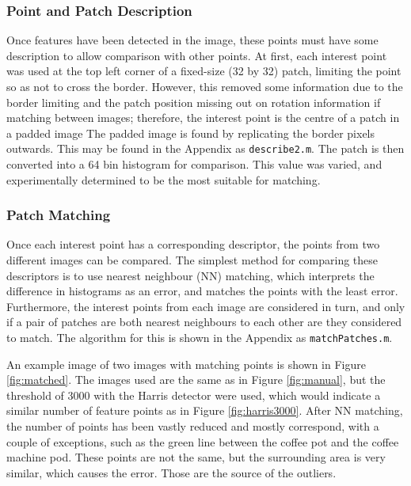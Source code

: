 \documentclass[a4paper, 10pt, conference]{ieeeconf}
\begin{document}
\subsubsection{Point and Patch Description}
Once features have been detected in the image, these points must have some description to allow comparison with other points. At first, each interest point was used at the top left corner of a fixed-size (32 by 32) patch, limiting the point so as not to cross the border. However, this removed some information due to the border limiting and the patch position missing out on rotation information if matching between images; therefore, the interest point is the centre of a patch in a padded image The padded image is found by replicating the border pixels outwards. This may be found in the Appendix as \texttt{describe2.m}. The patch is then converted into a 64 bin histogram for comparison. This value was varied, and experimentally determined to be the most suitable for matching.

\subsubsection{Patch Matching}
Once each interest point has a corresponding descriptor, the points from two different images can be compared. The simplest method for comparing these descriptors is to use nearest neighbour (NN) matching, which interprets the difference in histograms as an error, and matches the points with the least error. Furthermore, the interest points from each image are considered in turn, and only if a pair of patches are both nearest neighbours to each other are they considered to match. The algorithm for this is shown in  the Appendix as \texttt{matchPatches.m}.

An example image of two images with matching points is shown in Figure \ref{fig:matched}. The images used are the same as in Figure \ref{fig:manual}, but the threshold of 3000 with the Harris detector were used, which would indicate a similar number of feature points as in Figure \ref{fig:harris3000}. After NN matching, the number of points has been vastly reduced and mostly correspond, with a couple of exceptions, such as the green line between the coffee pot and the coffee machine pod. These points are not the same, but the surrounding area is very similar, which causes the error. Those are the source of the outliers.
\end{document}
